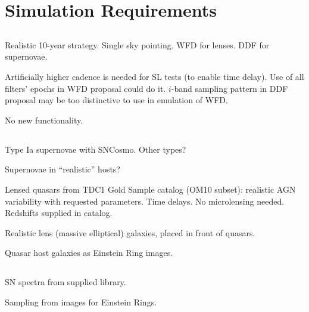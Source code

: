 \section{Simulation Requirements}
\label{sec:twinkles1:simulations}



\subsection{\OpSim}

Realistic 10-year strategy. Single sky pointing.
WFD for lenses. DDF for supernovae.

Artificially higher cadence is needed for SL tests (to enable time
delay).  Use of all filters' epochs in WFD proposal could do it.
$i$-band sampling pattern in DDF proposal may be too distinctive to
use in emulation of WFD.


No new functionality.


\subsection{\CatSim}

Type Ia supernovae with SNCosmo. Other types?

Supernovae in ``realistic'' hosts?

Lensed quasars from TDC1 Gold Sample catalog (OM10 subset):
realistic AGN variability with requested parameters. Time delays.
No microlensing needed. Redshifts supplied in catalog.

Realistic lens (massive elliptical) galaxies, placed in front of quasars.

Quasar host galaxies as Einstein Ring images.



\subsection{\PhoSim}

SN spectra from supplied library.

Sampling from images for Einstein Rings.


